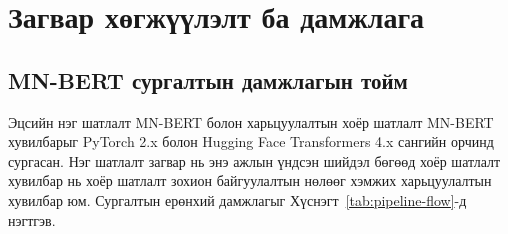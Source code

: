 ﻿%

\chapter{Загвар хөгжүүлэлт ба дамжлага}
\label{Chapter5}

\section{MN-BERT сургалтын дамжлагын тойм}

Эцсийн нэг шатлалт MN-BERT болон харьцуулалтын хоёр шатлалт MN-BERT хувилбарыг
PyTorch 2.x болон Hugging Face Transformers 4.x сангийн орчинд сургасан. Нэг
шатлалт загвар нь энэ ажлын үндсэн шийдэл бөгөөд хоёр шатлалт хувилбар нь
хоёр шатлалт зохион байгуулалтын нөлөөг хэмжих харьцуулалтын хувилбар юм. Сургалтын
ерөнхий дамжлагыг Хүснэгт~\ref{tab:pipeline-flow}-д нэгтгэв.

